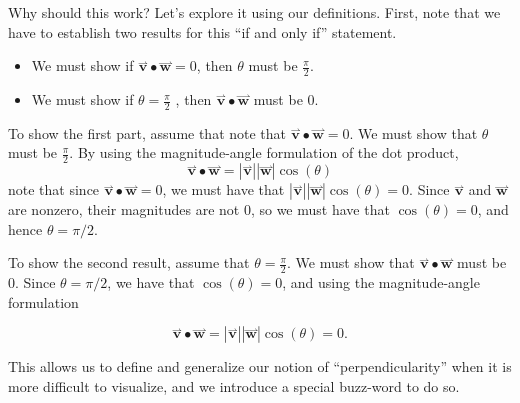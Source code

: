 \documentclass{ximera}
\begin{document}
\begin{explanation}
Why should this work?  Let's explore it using our definitions.  First, note that we have to establish two results for this ``if and only if'' statement.

\begin{itemize}
\item We must show if  $\overset{\boldsymbol{\rightharpoonup}}{\mathbf{v}} \bullet \overset{\boldsymbol{\rightharpoonup}}{\mathbf{w}} = 0$, then $\theta$ must be $\frac{\pi}{2}$.
\item We must show if $\theta = \frac{\pi}{2}$ , then $\overset{\boldsymbol{\rightharpoonup}}{\mathbf{v}} \bullet \overset{\boldsymbol{\rightharpoonup}}{\mathbf{w}}$ must be $0$.
\end{itemize}

To show the first part, assume that note that $\overset{\boldsymbol{\rightharpoonup}}{\mathbf{v}} \bullet \overset{\boldsymbol{\rightharpoonup}}{\mathbf{w}} = 0$.  We must show that $\theta$ must be $\frac{\pi}{2}$.  By using the magnitude-angle formulation of the dot product, 
\[
\overset{\boldsymbol{\rightharpoonup}}{\mathbf{v}} \bullet \overset{\boldsymbol{\rightharpoonup}}{\mathbf{w}} = |\overset{\boldsymbol{\rightharpoonup}}{\mathbf{v}}||\overset{\boldsymbol{\rightharpoonup}}{\mathbf{w}}|\cos(\theta) 
\]
note that since $\overset{\boldsymbol{\rightharpoonup}}{\mathbf{v}} \bullet \overset{\boldsymbol{\rightharpoonup}}{\mathbf{w}} = 0$, we must have that $|\overset{\boldsymbol{\rightharpoonup}}{\mathbf{v}}||\overset{\boldsymbol{\rightharpoonup}}{\mathbf{w}}|\cos(\theta)  = 0$.  Since $\overset{\boldsymbol{\rightharpoonup}}{\mathbf{v}}$ and $\overset{\boldsymbol{\rightharpoonup}}{\mathbf{w}}$ are nonzero, their magnitudes are not $0$, so we must have that $\cos(\theta) = 0$, and hence $\theta = \pi/2$.

To show the second result, assume that $\theta = \frac{\pi}{2}$.  We must show that $\overset{\boldsymbol{\rightharpoonup}}{\mathbf{v}} \bullet \overset{\boldsymbol{\rightharpoonup}}{\mathbf{w}}$ must be $0$.  Since $\theta = \pi/2$, we have that $\cos(\theta) = 0$, and using the magnitude-angle formulation

\[
\overset{\boldsymbol{\rightharpoonup}}{\mathbf{v}} \bullet \overset{\boldsymbol{\rightharpoonup}}{\mathbf{w}} = |\overset{\boldsymbol{\rightharpoonup}}{\mathbf{v}}||\overset{\boldsymbol{\rightharpoonup}}{\mathbf{w}}|\cos(\theta) = 0.
\]
\end{explanation}

This allows us to define and generalize our notion of ``perpendicularity'' when it is more difficult to visualize, and we introduce a special buzz-word to do so.
\end{document}
